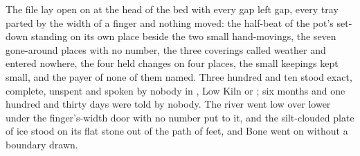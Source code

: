 The file lay open on  at the head of the bed with every gap left gap, every tray parted by the width of a finger and nothing moved: the half-beat of the pot's set-down standing on its own place beside the two small hand-movings, the seven gone-around places with no number, the three coverings called weather and entered nowhere, the four held changes on four places, the small keepings kept small, and the payer of none of them named. Three hundred and ten stood exact, complete, unspent and spoken by nobody in , Low Kiln or ; six months and one hundred and thirty days were told by nobody. The river went low over lower under the finger's-width door with no number put to it, and the silt-clouded plate of ice stood on its flat stone out of the path of feet, and Bone went on without a boundary drawn.
